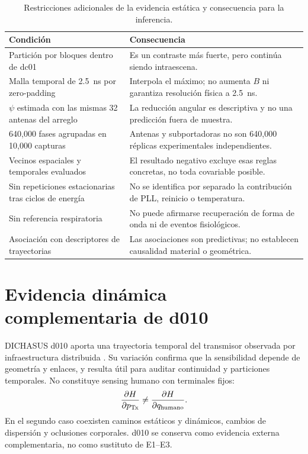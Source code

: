 \begin{table}[p]
\centering
\caption{Restricciones adicionales de la evidencia estática y consecuencia para la inferencia.}
\label{tab:dc01_validity_cont}
\small
\begin{tabularx}{\textwidth}{P{4.0cm}X}
\toprule
Condición & Consecuencia\\
\midrule
Partición por bloques dentro de dc01 & Es un contraste más fuerte, pero continúa
siendo intraescena.\\
Malla temporal de \SI{2.5}{ns} por zero-padding & Interpola el máximo; no aumenta
$B$ ni garantiza resolución física a \SI{2.5}{ns}.\\
$\psi$ estimada con las mismas 32 antenas del arreglo & La reducción angular es
descriptiva y no una predicción fuera de muestra.\\
640,000 fases agrupadas en 10,000 capturas & Antenas y subportadoras no son
640,000 réplicas experimentales independientes.\\
Vecinos espaciales y temporales evaluados & El resultado negativo excluye esas
reglas concretas, no toda covariable posible.\\
Sin repeticiones estacionarias tras ciclos de energía & No se identifica por
separado la contribución de PLL, reinicio o temperatura.\\
Sin referencia respiratoria & No puede afirmarse recuperación de forma de onda ni
de eventos fisiológicos.\\
Asociación con descriptores de trayectorias & Las asociaciones son predictivas; no
establecen causalidad material o geométrica.\\
\bottomrule
\end{tabularx}
\end{table}

\section{Evidencia dinámica complementaria de d010}

DICHASUS d010 aporta una trayectoria temporal del transmisor observada por infraestructura distribuida \citep{DICHASUSd010Web}. Su variación confirma que la sensibilidad depende de geometría y enlaces, y resulta útil para auditar continuidad y particiones temporales. No constituye sensing humano con terminales fijos:
\begin{equation}
\frac{\partial H}{\partial p_{\rm Tx}}
\ne
\frac{\partial H}{\partial q_{\rm humano}}.
\label{eq:d010_derivative_distinction}
\end{equation}
En el segundo caso coexisten caminos estáticos y dinámicos, cambios de dispersión y oclusiones corporales. d010 se conserva como evidencia externa complementaria, no como sustituto de E1--E3.

